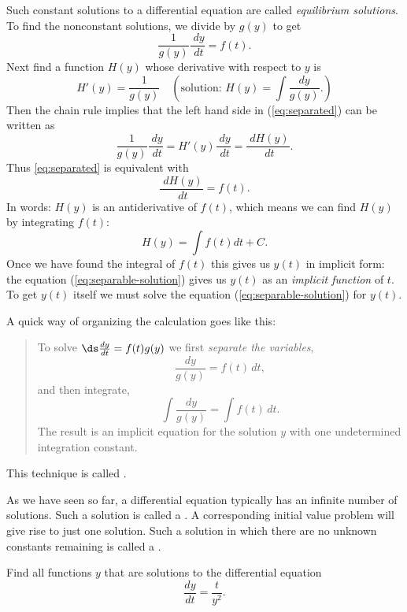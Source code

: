 Such constant solutions to a differential equation are called \textit{equilibrium solutions}. To find the nonconstant solutions, we divide by $g(y)$ to get
\begin{equation}
  \label{eq:separated}
  \frac{1}{ g(y)} \frac{\; d y}{\; d t} = f(t). 
\end{equation}
Next find a function $H(y)$ whose derivative with respect to $y$ is
\begin{equation}\label{eq:separable-3}
  H'(y) = \frac{1}{g(y)}
  \quad\left(\text{solution: } H(y) = \int {\frac{dy}{g(y)}}.\right)
\end{equation}
Then the chain rule implies that the left hand side in (\ref{eq:separated}) can be written as
\[
  \frac{1}{ g(y)} \frac{\; d y}{\; d t} = H'(y) \frac{\; d y}{\; d t} =
  \frac{\; d H(y)}{\; d t}.
\]
Thus \eqref{eq:separated} is equivalent with
\[
\frac{\; d H(y)}{\; d t} = f(t).
\]
In words: $H(y)$ is an antiderivative of $f(t)$, which means we can find $H(y)$
by integrating $f(t)$:
\begin{equation}
  \label{eq:separable-solution}
  H(y) = \int f(t) dt +C. 
\end{equation}
Once we have found the integral of $f(t)$ this gives us $y(t)$ in implicit form: the
equation (\ref{eq:separable-solution}) gives us $y(t)$ as an \textit{implicit
  function} of $t$.  To get $y(t)$ itself we must solve the equation
(\ref{eq:separable-solution}) for $y(t)$.

A quick way of organizing the calculation goes like this:
\begin{quote}
  To solve \( \ds \frac{dy}{ dt} = f(t)g(y)\) we first \textit{separate the
    variables},
  \[
  \frac{d y}{g(y)} = f(t)\,d t,
  \]
  and then integrate,
  \[
  \int\frac{d y}{g(y)} = \int f(t)\, dt.
  \]
  The result is an implicit equation for the solution $y$ with one undetermined
  integration constant.
\end{quote}

This technique is called . 

As we have seen so far, a differential equation typically has an infinite number of solutions. Such a solution is called a .  A corresponding initial value problem will give rise to just one
solution. Such a solution in which there are no unknown constants remaining is called a .


\begin{example}{}{}
Find all functions $y$ that are solutions to the differential equation 
$$\frac{dy}{dt}= \frac{t}{y^2}.$$
\end{example}


